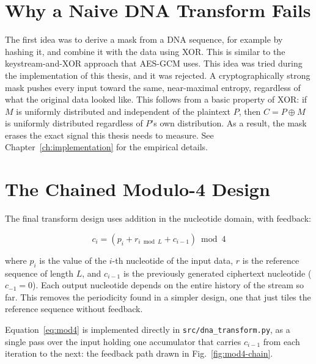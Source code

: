 \documentclass[12pt,a4paper,twoside]{report}
\numberwithin{equation}{chapter}
\begin{document}
\section{Why a Naive DNA Transform Fails}
The first idea was to derive a mask from a DNA sequence, for example by
hashing it, and combine it with the data using XOR. This is similar to
the keystream-and-XOR approach that AES-GCM uses. This idea was tried
during the implementation of this thesis, and it was rejected. A
cryptographically strong mask pushes every input toward the same,
near-maximal entropy, regardless of what the original data looked like.
This follows from a basic property of XOR: if $M$ is uniformly
distributed and independent of the plaintext $P$, then
$C = P \oplus M$ is uniformly distributed regardless of $P$'s own
distribution. As a result, the mask erases the exact
signal this thesis needs to measure. See Chapter~\ref{ch:implementation}
for the empirical details.

\section{The Chained Modulo-4 Design}
\label{sec:mod4chain}
The final transform design uses addition in the nucleotide domain, with
feedback:

\begin{equation}
c_i = \left( p_i + r_{i \bmod L} + c_{i-1} \right) \bmod 4
\label{eq:mod4}
\end{equation}

where $p_i$ is the value of the $i$-th nucleotide of the input data,
$r$ is the reference sequence of length $L$, and $c_{i-1}$ is the
previously generated ciphertext nucleotide ($c_{-1} = 0$). Each output
nucleotide depends on the entire history of the stream so far. This
removes the periodicity found in a simpler design, one that just tiles
the reference sequence without feedback.

Equation~\ref{eq:mod4} is implemented directly in
\texttt{src/dna\_transform.py}, as a single pass over the input holding
one accumulator that carries $c_{i-1}$ from each iteration to the next:
the feedback path drawn in Fig.~\ref{fig:mod4-chain}.
\end{document}
